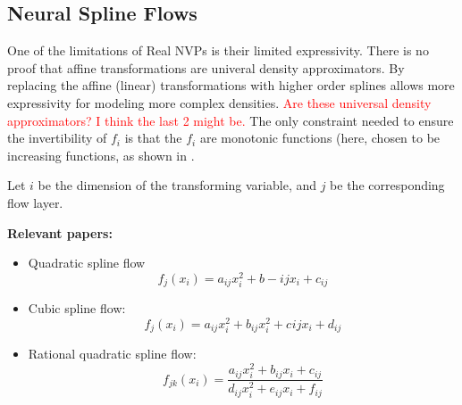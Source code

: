\FloatBarrier
\clearpage
\subsection{Neural Spline Flows}

One of the limitations of Real NVPs is their limited expressivity. There is no proof that affine transformations are univeral density approximators.
By replacing the affine (linear) transformations with higher order splines allows more expressivity for modeling more complex densities. \textcolor{red}{Are these universal density approximators? I think the last 2 might be.}
The only constraint needed to ensure the invertibility of $f_i$ is that the $f_i$ are monotonic functions (here, chosen to be increasing functions, as shown in \Fig{\ref{}}.

Let $i$ be the dimension of the transforming variable, and $j$ be the corresponding flow layer.

\textbf{Relevant papers:}
\begin{itemize}
	\item Quadratic spline flow \cite{1808.03856}
	\begin{equation}
		f_j(x_i) = a_{ij} x_i^2 + b-{ij} x_i + c_{ij}
	\end{equation}
	\item Cubic spline flow: \cite{1906.02145}
		\begin{equation}
		f_j(x_i) = a_{ij} x_i^2 + b_{ij} x_i^2 + c_{}ij x_i + d_{ij}
	\end{equation}
	\item Rational quadratic spline flow: \cite{1906.04032}
	\begin{equation}
		f_{jk}(x_i) = \frac{a_{ij} x_i^2 + b_{ij} x_i + c_{ij} } { d_{ij} x_i^2 + e_{ij} x_i + f_{ij}}
	\end{equation}
\end{itemize}


